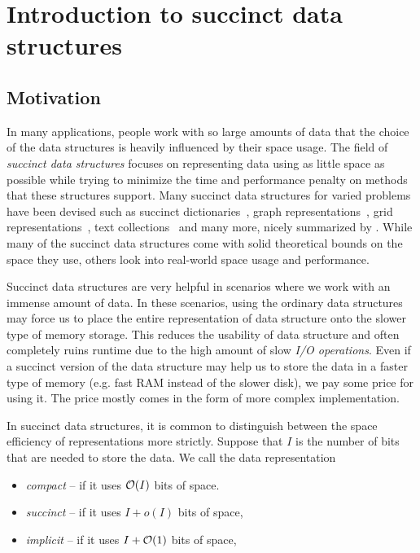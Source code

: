 \chapter{Introduction to succinct data structures}
\label{kap:kap1}


\section{Motivation}

In many applications, people work with so large amounts of data that the choice of
the data structures is heavily influenced by their space usage. The field
of \textit{succinct data structures} focuses on representing data using as little
space as possible while trying to minimize the time and performance penalty on methods
that these structures support. Many succinct data structures for varied problems
have been devised such as succinct dictionaries~\citep{raman2007succinct},
graph representations~\citep{farzan2013succinct}, grid representations~\citep{chazelle1988functional},
text collections~\citep{ferragina2000opportunistic} and many more, nicely summarized by
\cite{navarro2016compact}. While many of the succinct data structures come with solid
theoretical bounds on the space they use, others look into real-world space usage and
performance.

Succinct data structures are very helpful in scenarios where we work with an immense amount
of data. In these scenarios, using the ordinary data structures may force us to place
the entire representation of data structure onto the slower type of memory storage. This
reduces the usability of data structure and often completely ruins runtime due to the
high amount of slow \textit{I/O operations}. Even if a succinct version of the data structure
may help us to store the data in a faster type of memory (e.g. fast RAM instead of the slower disk),
we pay some price for using it. The price mostly comes in the form of more complex implementation.

In succinct data structures, it is common to distinguish between the space efficiency of
representations more strictly. Suppose that $I$ is the number of bits that are needed to
store the data. We call the data representation
\begin{itemize}
	\item \textit{compact} -- if it uses $\mathcal{O}(I)$ bits of space.
	\item \textit{succinct} -- if it uses $I + o(I)$ bits of space,
	\item \textit{implicit} -- if it uses $I + \mathcal{O}(1)$ bits of space,
\end{itemize}

